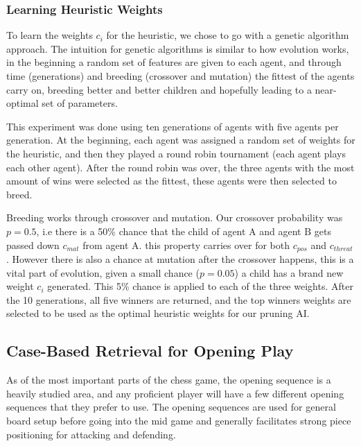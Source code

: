 \documentclass[letterpaper]{article}
\begin{document}
\subsubsection{Learning Heuristic Weights}
To learn the weights $c_i$ for the heuristic, we chose to go with a genetic algorithm approach. The intuition for genetic algorithms is similar to how evolution works, in the beginning a random set of features are given to each agent, and through time (generations) and breeding (crossover and mutation) the fittest of the agents carry on, breeding better and better children and hopefully leading to a near-optimal set of parameters.

This experiment was done using ten generations of agents with five agents per generation. At the beginning, each agent was assigned a random set of weights for the heuristic, and then they played a round robin tournament (each agent plays each other agent). After the round robin was over, the three agents with the most amount of wins were selected as the fittest, these agents were then selected to breed.

Breeding works through crossover and mutation. Our crossover probability was $p=0.5$, i.e there is a 50\% chance that the child of agent A and agent B gets passed down $c_{mat}$ from agent A. this property carries over for both $c_{pos}$ and $c_{threat}$. However there is also a chance at mutation after the crossover happens, this is a vital part of evolution, given a small chance ($p=0.05$) a child has a brand new weight $c_i$ generated. This 5\% chance is applied to each of the three weights. After the 10 generations, all five winners are returned, and the top winners weights are selected to be used as the optimal heuristic weights for our pruning AI. 

\subsection{Case-Based Retrieval for Opening Play}
As of the most important parts of the chess game, the opening sequence is a heavily studied area, and any proficient player will have a few different opening sequences that they prefer to use. The opening sequences are used for general board setup before going into the mid game and generally facilitates strong piece positioning for attacking and defending.
\end{document}
